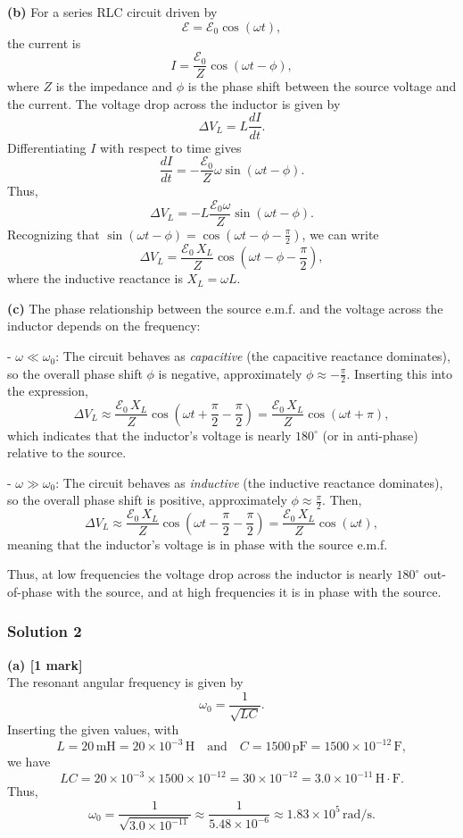 \documentclass{article}
\begin{document}
\textbf{(b)} \quad For a series RLC circuit driven by 
\[
\mathcal{E} = \mathcal{E}_0\cos(\omega t),
\]
the current is 
\[
I = \frac{\mathcal{E}_0}{Z}\cos(\omega t - \phi),
\]
where \(Z\) is the impedance and \(\phi\) is the phase shift between the source voltage and the current. The voltage drop across the inductor is given by 
\[
\Delta V_L = L\frac{dI}{dt}.
\]
Differentiating \(I\) with respect to time gives
\[
\frac{dI}{dt} = -\frac{\mathcal{E}_0}{Z}\omega \sin(\omega t - \phi).
\]
Thus,
\[
\Delta V_L = -L\frac{\mathcal{E}_0\omega}{Z}\sin(\omega t - \phi).
\]
Recognizing that \(\sin(\omega t - \phi) = \cos\left(\omega t - \phi - \frac{\pi}{2}\right)\), we can write
\[
\Delta V_L = \frac{\mathcal{E}_0\,X_L}{Z}\cos\left(\omega t - \phi - \frac{\pi}{2}\right),
\]
where the inductive reactance is \(X_L = \omega L\).

\textbf{(c)} \quad The phase relationship between the source e.m.f. and the voltage across the inductor depends on the frequency:

- \(\omega \ll \omega_0\): The circuit behaves as \emph{capacitive} (the capacitive reactance dominates), so the overall phase shift \(\phi\) is negative, approximately \(\phi \approx -\frac{\pi}{2}\). Inserting this into the expression,
  \[
  \Delta V_L \approx \frac{\mathcal{E}_0\,X_L}{Z}\cos\left(\omega t + \frac{\pi}{2} - \frac{\pi}{2}\right)
  = \frac{\mathcal{E}_0\,X_L}{Z}\cos(\omega t + \pi),
  \]
  which indicates that the inductor’s voltage is nearly \(180^\circ\) (or in anti-phase) relative to the source.

- \(\omega \gg \omega_0\): The circuit behaves as \emph{inductive} (the inductive reactance dominates), so the overall phase shift is positive, approximately \(\phi \approx \frac{\pi}{2}\). Then,
  \[
  \Delta V_L \approx \frac{\mathcal{E}_0\,X_L}{Z}\cos\left(\omega t - \frac{\pi}{2} - \frac{\pi}{2}\right)
  = \frac{\mathcal{E}_0\,X_L}{Z}\cos(\omega t),
  \]
  meaning that the inductor’s voltage is in phase with the source e.m.f.

Thus, at low frequencies the voltage drop across the inductor is nearly \(180^\circ\) out-of-phase with the source, and at high frequencies it is in phase with the source.

\subsubsection{Solution 2}
\textbf{(a) [1 mark]}\\
The resonant angular frequency is given by
\[
\omega_0=\frac{1}{\sqrt{LC}}.
\]
Inserting the given values, with 
\[
L=20\,\mathrm{mH}=20\times10^{-3}\,\mathrm{H} \quad\text{and}\quad C=1500\,\mathrm{pF}=1500\times10^{-12}\,\mathrm{F},
\]
we have
\[
LC=20\times10^{-3}\times1500\times10^{-12}=30\times10^{-12}=3.0\times10^{-11}\,\mathrm{H\cdot F}.
\]
Thus,
\[
\omega_0=\frac{1}{\sqrt{3.0\times10^{-11}}}\approx\frac{1}{5.48\times10^{-6}}\approx1.83\times10^5\,\mathrm{rad/s}.
\]
\end{document}

